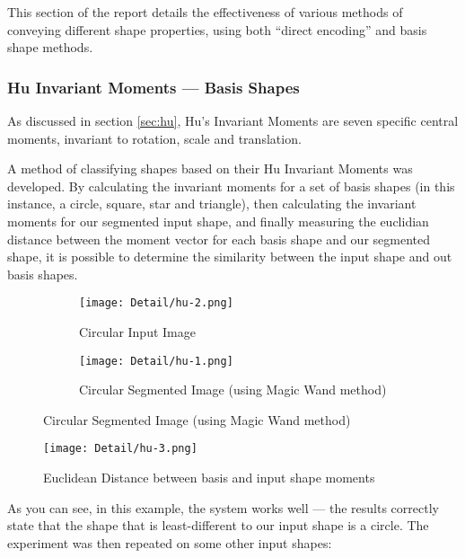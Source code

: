 This section of the report details the effectiveness of various methods of conveying different shape properties, using both ``direct encoding'' and basis shape methods.

\subsubsection{Hu Invariant Moments --- Basis Shapes}
As discussed in section \ref{sec:hu}, Hu's Invariant Moments are seven specific central moments, invariant to rotation, scale and translation.

A method of classifying shapes based on their Hu Invariant Moments was developed. By calculating the invariant moments for a set of basis shapes (in this instance, a circle, square, star and triangle), then calculating the invariant moments for our segmented input shape, and finally measuring the euclidian distance between the moment vector for each basis shape and our segmented shape, it is possible to determine the similarity between the input shape and out basis shapes.



\begin{figure}[H]
    \centering
    \begin{subfigure}[h]{0.4\textwidth}
        \centering
        \texttt{[image: Detail/hu-2.png]}
        \caption{Circular Input Image}
    \end{subfigure}
    \begin{subfigure}[h]{0.4\textwidth}
        \centering
        \texttt{[image: Detail/hu-1.png]}
        \caption{Circular Segmented Image (using Magic Wand method)}
    \end{subfigure}
\end{figure}

\begin{figure}[H]
    \centering
    \texttt{[image: Detail/hu-3.png]}
    \caption{Euclidean Distance between basis and input shape moments}
\end{figure}

As you can see, in this example, the system works well --- the results correctly state that the shape that is least-different to our input shape is a circle. The experiment was then repeated on some other input shapes:

